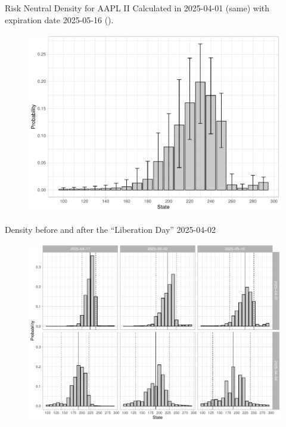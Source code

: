 \documentclass[10pt,aspectratio=43]{beamer}
\begin{document}
\begin{frame}{Risk Neutral Density for AAPL II}
    Calculated in 2025-04-01 (same) with expiration date 2025-05-16 ().
    \begin{figure}\centering
        \begin{minipage}{0.75\linewidth}
        \includegraphics[width=\linewidth]{betas_01_3.pdf}
     \end{minipage}
    \end{figure}
\end{frame}



\begin{frame}{Density before and after the ``Liberation Day'' 2025-04-02}
    \begin{figure} \centering
        \begin{minipage}{0.9\linewidth}
                \includegraphics[width=\linewidth]{betas.pdf}
        \end{minipage}
    \end{figure}
\end{frame}
 
\end{document}

